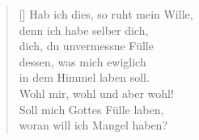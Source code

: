 \begin{multicols}{2}
\begin{verse}[\versewidth]
 Hab ich dies, so ruht mein Wille,\\
denn ich habe selber dich,\\
dich, du unvermessne Fülle\\
dessen, was mich ewiglich\\
in dem Himmel laben soll.\\
Wohl mir, wohl und aber wohl!\\
Soll mich Gottes Fülle laben,\\
woran will ich Mangel haben?

\end{verse}
\end{multicols}
